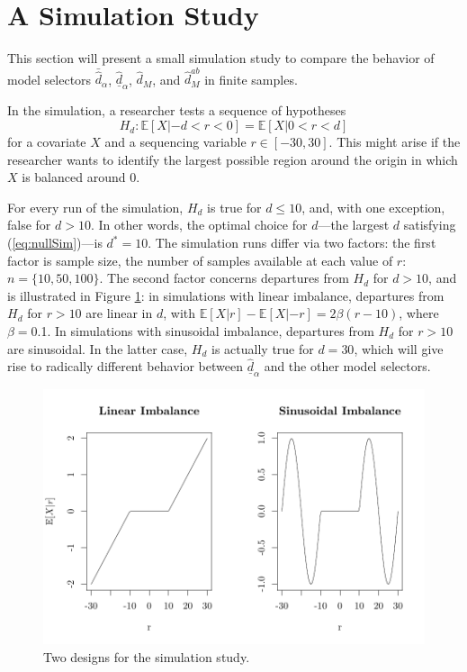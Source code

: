 \documentclass[12pt]{article}\usepackage[]{graphicx}\usepackage[]{color}
\makeatletter
\def\maxwidth{ %
  \ifdim\Gin@nat@width>\linewidth
    \linewidth
  \else
    \Gin@nat@width
  \fi
}
\newcommand{\dalphaU}{\bar{\hat{d}}_\alpha}
\newcommand{\dalphaB}{\underline{\hat{d}}_\alpha}
\newcommand{\dstar}{d^*}
\newcommand{\dhatm}{\hat{d}_M}
\newcommand{\dhatmab}{\hat{d}^{ab}_M}
\newcommand{\EE}{\mathbb{E}}
\makeatother
\begin{document}
\section{A Simulation Study}\label{sec:simulation}

This section will present a small simulation study to compare the
behavior of model selectors $\dalphaU$, $\dalphaB$,
$\dhatm$, and $\dhatmab$ in finite samples.

In the simulation, a researcher tests a sequence of hypotheses
\begin{equation}\label{eq:nullSim}
H_d: \EE [X|-d<r<0]=\EE [X|0<r<d]
\end{equation}
for a covariate $X$ and a sequencing variable $r\in [-30,30]$.
This might arise if the researcher wants to identify the largest
possible region around the origin in which $X$ is balanced around 0.

For every run of the simulation, $H_d$ is true for $d\le 10$, and,
with one exception, false for $d>10$.
In other words, the optimal choice for $d$---the largest $d$
satisfying (\ref{eq:nullSim})---is $\dstar=10$.
The simulation runs differ via two factors: the first factor is sample
size, the number of samples available at each value of $r$:
$n=\{10,50,100\}$.
The second factor concerns departures from $H_d$ for $d>10$, and is
illustrated in Figure \ref{fig:illustrateSim}: in simulations with
linear imbalance, departures from $H_d$ for $r>10$ are linear in $d$, with $\EE
[X|r]-\EE[X|-r]=2\beta(r-10)$, where $\beta=$0.1.
In simulations with sinusoidal imbalance, departures from $H_d$ for
$r>10$ are sinusoidal.
In the latter case, $H_d$ is actually true for $d=30$, which will give
rise to radically different behavior between $\dalphaB$ and the other
model selectors.
\begin{figure}

\includegraphics[width=\maxwidth]{figure/illlustrateSim-1} 

\caption{Two designs for the simulation study.}
\label{fig:illustrateSim}
\end{figure}
\end{document}
